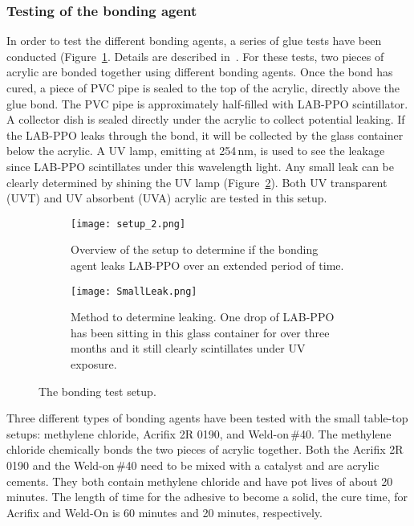\subsubsection{Testing of the bonding agent}
In order to test the different bonding agents, a series of glue tests have been conducted (Figure~\ref{gluesetup1}. Details are described in~\cite{tanner:2014}. For these tests, two pieces of acrylic are bonded together using different bonding agents. Once the bond has cured, a piece of PVC pipe is sealed to the top of the acrylic, directly above the glue bond. The PVC pipe is approximately half-filled with LAB-PPO scintillator. A collector dish is sealed directly under the acrylic to collect potential leaking. If the LAB-PPO leaks through the bond, it will be collected by the glass container below the acrylic. A UV lamp, emitting at 254\,nm, is used to see the leakage since LAB-PPO scintillates under this wavelength light. Any small leak can be clearly determined by shining the UV lamp (Figure~\ref{gluesetup2}). Both UV transparent (UVT) and UV absorbent (UVA) acrylic are tested in this setup.

\begin{figure}[t!]
    \centering
\begin{subfigure}{.45\textwidth}
    \centering
  \texttt{[image: setup\_2.png]}
  \caption{Overview of the setup to determine if the bonding agent leaks LAB-PPO over an extended period of time.}
  \label{gluesetup1}
\end{subfigure}
\hspace{0.5cm}
\begin{subfigure}{.45\textwidth}
    \centering
  \texttt{[image: SmallLeak.png]}
  \caption{Method to determine leaking. One drop of LAB-PPO has been sitting in this glass container for over three months and it still clearly scintillates under UV exposure.}
  \label{gluesetup2}
\end{subfigure}
  \caption{The bonding test setup.}
\label{fig:gluesetups}
\end{figure}


Three different types of bonding agents have been tested with the small table-top setups: methylene chloride, Acrifix 2R 0190, and Weld-on\,\#40. The methylene chloride chemically bonds the two pieces of acrylic together. Both the Acrifix 2R 0190 and the Weld-on\,\#40 need to be mixed with a catalyst and are acrylic cements. They both contain methylene chloride and have pot lives of about 20 minutes. The length of time for the adhesive to become a solid, the cure time, for Acrifix and Weld-On is 60 minutes and 20 minutes, respectively.

